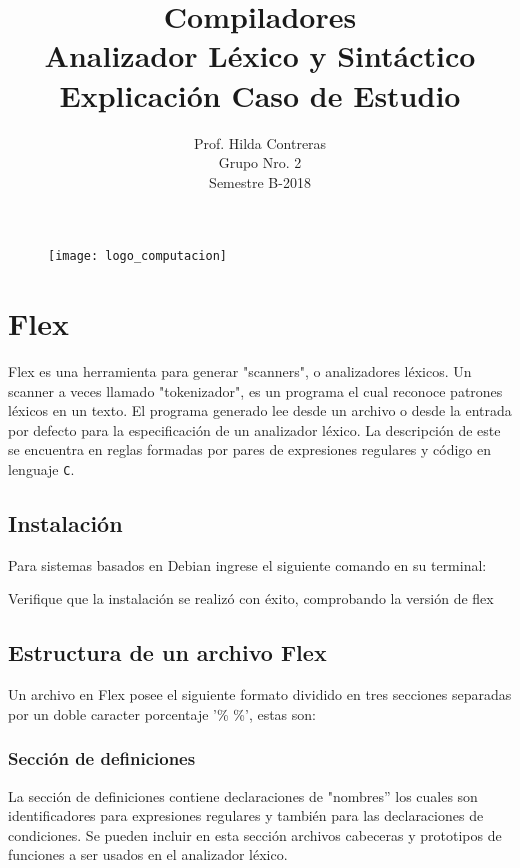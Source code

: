 \documentclass[spanish]{article}
\title{Compiladores \\ Analizador Léxico y Sintáctico \\ Explicación Caso de Estudio}
\author{Prof. Hilda Contreras \\ Grupo Nro. 2 \\ Semestre B-2018}
\date{}
\begin{document}

\begin{figure}
  \centering
    \texttt{[image: logo\_computacion]}
\end{figure}

\maketitle

\section{Flex}
Flex es una herramienta para generar "scanners", o analizadores léxicos. Un scanner a veces llamado "tokenizador", es un programa el cual reconoce patrones léxicos en un texto. El programa generado lee desde un archivo o desde la entrada por defecto para la especificación de un analizador léxico. La descripción de este se encuentra en reglas formadas por pares de expresiones regulares y código en lenguaje \texttt{C}.
\subsection{Instalación}
Para sistemas basados en Debian ingrese el siguiente comando en su terminal:

\begin{center}
\end{center}

Verifique que la instalación se realizó con éxito, comprobando la versión de flex

\begin{center}
\end{center}

\subsection{Estructura de un archivo Flex}
Un archivo en Flex posee el siguiente formato dividido en tres secciones separadas por un doble caracter porcentaje '\% \%', estas son:

\subsubsection{Sección de definiciones}
La sección de definiciones contiene declaraciones de "nombres” los cuales son identificadores para expresiones regulares y también para las declaraciones de condiciones. Se pueden incluir en esta sección archivos cabeceras y prototipos de funciones a ser usados en el analizador léxico.
\end{document}

